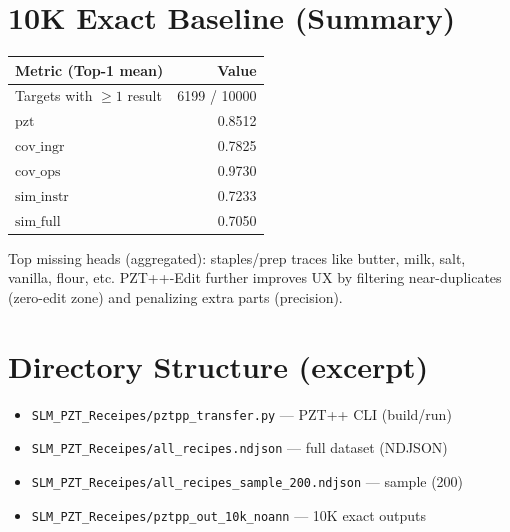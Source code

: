 \documentclass[11pt]{article}
\begin{document}
\section{10K Exact Baseline (Summary)}
\begin{center}
\begin{tabular}{l r}
\hline
Metric (Top-1 mean) & Value \\
\hline
Targets with $\ge1$ result & 6199 / 10000 \\
$\text{pzt}$ & 0.8512 \\
$\text{cov\_ingr}$ & 0.7825 \\
$\text{cov\_ops}$ & 0.9730 \\
$\text{sim\_instr}$ & 0.7233 \\
$\text{sim\_full}$ & 0.7050 \\
\hline
\end{tabular}
\end{center}

Top missing heads (aggregated): staples/prep traces like butter, milk, salt, vanilla, flour, etc. PZT++-Edit further improves UX by filtering near-duplicates (zero-edit zone) and penalizing extra parts (precision).

\section{Directory Structure (excerpt)}
\begin{itemize}[leftmargin=*]
  \item \texttt{SLM\_PZT\_Receipes/pztpp\_transfer.py} --- PZT++ CLI (build/run)
  \item \texttt{SLM\_PZT\_Receipes/all\_recipes.ndjson} --- full dataset (NDJSON)
  \item \texttt{SLM\_PZT\_Receipes/all\_recipes\_sample\_200.ndjson} --- sample (200)
  \item \texttt{SLM\_PZT\_Receipes/pztpp\_out\_10k\_noann} --- 10K exact outputs
\end{itemize}
\end{document}
